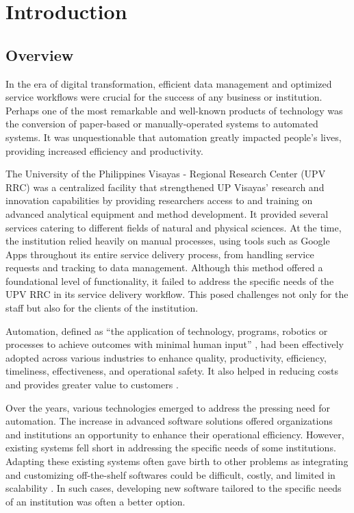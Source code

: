 \chapter{Introduction}
\label{sec:researchdesc}    %

\section{Overview}
\label{sec:overview}

In the era of digital transformation, efficient data management and optimized service workflows were crucial for the success of any business or institution. Perhaps one of the most remarkable and well-known products of technology was the conversion of paper-based or manually-operated systems to automated systems. It was unquestionable that automation greatly impacted people's lives, providing increased efficiency and productivity.

The University of the Philippines Visayas - Regional Research Center (UPV RRC) was a centralized facility that strengthened UP Visayas’ research and innovation capabilities by providing researchers access to and training on advanced analytical equipment and method development. It provided several services catering to different fields of natural and physical sciences. At the time, the institution relied heavily on manual processes, using tools such as Google Apps throughout its entire service delivery process, from handling service requests and tracking to data management. Although this method offered a foundational level of functionality, it failed to address the specific needs of the UPV RRC in its service delivery workflow. This posed challenges not only for the staff but also for the clients of the institution.

Automation, defined as “the application of technology, programs, robotics or processes to achieve outcomes with minimal human input” \cite{ibm}, had been effectively adopted across various industries to enhance quality, productivity, efficiency, timeliness, effectiveness, and operational safety. It also helped in reducing costs and provides greater value to customers \cite{caban2021}. 

Over the years, various technologies emerged to address the pressing need for automation. The increase in advanced software solutions offered organizations and institutions an opportunity to enhance their operational efficiency. However, existing systems fell short in addressing the specific needs of some institutions. Adapting these existing systems often gave birth to other problems as integrating and customizing off-the-shelf softwares could be difficult, costly, and limited in scalability \cite{bitcat2023}. In such cases, developing new software tailored to the specific needs of an institution was often a better option.

